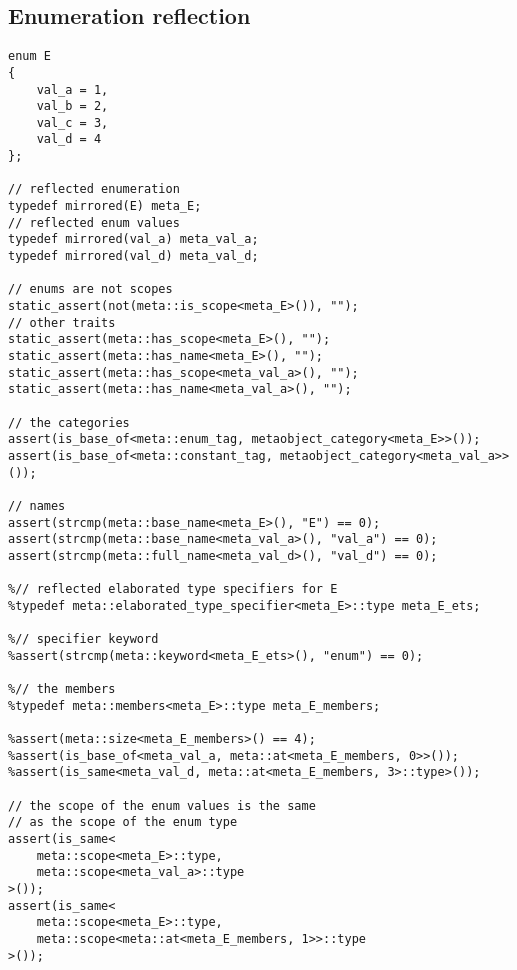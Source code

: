 \subsection{Enumeration reflection}

\begin{verbatim}
enum E
{
	val_a = 1,
	val_b = 2,
	val_c = 3,
	val_d = 4
};

// reflected enumeration
typedef mirrored(E) meta_E;
// reflected enum values
typedef mirrored(val_a) meta_val_a;
typedef mirrored(val_d) meta_val_d;

// enums are not scopes
static_assert(not(meta::is_scope<meta_E>()), "");
// other traits
static_assert(meta::has_scope<meta_E>(), "");
static_assert(meta::has_name<meta_E>(), "");
static_assert(meta::has_scope<meta_val_a>(), "");
static_assert(meta::has_name<meta_val_a>(), "");

// the categories
assert(is_base_of<meta::enum_tag, metaobject_category<meta_E>>());
assert(is_base_of<meta::constant_tag, metaobject_category<meta_val_a>>());

// names
assert(strcmp(meta::base_name<meta_E>(), "E") == 0);
assert(strcmp(meta::base_name<meta_val_a>(), "val_a") == 0);
assert(strcmp(meta::full_name<meta_val_d>(), "val_d") == 0);

%// reflected elaborated type specifiers for E
%typedef meta::elaborated_type_specifier<meta_E>::type meta_E_ets;

%// specifier keyword
%assert(strcmp(meta::keyword<meta_E_ets>(), "enum") == 0);

%// the members
%typedef meta::members<meta_E>::type meta_E_members;

%assert(meta::size<meta_E_members>() == 4);
%assert(is_base_of<meta_val_a, meta::at<meta_E_members, 0>>());
%assert(is_same<meta_val_d, meta::at<meta_E_members, 3>::type>());

// the scope of the enum values is the same
// as the scope of the enum type
assert(is_same<
	meta::scope<meta_E>::type,
	meta::scope<meta_val_a>::type
>());
assert(is_same<
	meta::scope<meta_E>::type,
	meta::scope<meta::at<meta_E_members, 1>>::type
>());

\end{verbatim}
